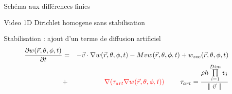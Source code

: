 \begin{frame}{Schéma aux différences finies}
\end{frame}

\begin{frame}
  Video 1D Dirichlet homogene sans stabilisation
\end{frame}

\begin{frame}{Stabilisation : ajout d'un terme de diffusion artificiel}
  \vspace*{-0.6cm}
  \begin{eqnarray*}
    \frac{\partial w(\vec{r}, \theta, \phi, t)}{\partial t} &=& -\vec{v} \cdot \nabla w(\vec{r}, \theta, \phi, t) - M v w(\vec{r}, \theta, \phi, t) + 
    w_{sce}(\vec{r}, \theta, \phi, t) \\
    &+& \text{ \textcolor{red}{$\nabla (\tau_{art} \nabla w(\vec{r}, \theta, \phi, t))$} } 
    \qquad \tau_{art} = \frac{\rho h \prod \limits_{i=1}^{Dim} v_i }{\parallel \vec{v} \parallel}
  \end{eqnarray*}



\end{frame}
